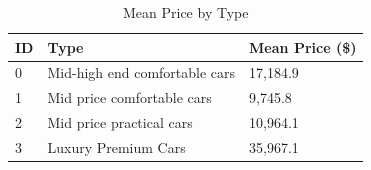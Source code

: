 \documentclass{article}
\begin{document}
\begin{table}[H]
    \centering
    \caption{Mean Price by Type}
    \begin{tabular}{lll}
        \toprule
        \textbf{ID} & \textbf{Type}                 & \textbf{Mean Price (\$)} \\
        \midrule
        0           & Mid-high end comfortable cars & 17,184.9                 \\
        1           & Mid price comfortable cars    & 9,745.8                  \\
        2           & Mid price practical cars      & 10,964.1                 \\
        3           & Luxury Premium Cars           & 35,967.1                 \\
        \bottomrule
    \end{tabular}
\end{table}
\end{document}
